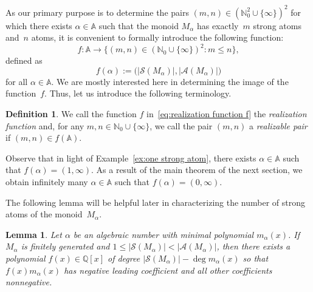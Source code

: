 \documentclass[11pt]{amsart}
\newtheorem{lemma}[theorem]{Lemma}
\theoremstyle{definition}
\newtheorem{definition}[theorem]{Definition}
\theoremstyle{remark}
\numberwithin{equation}{section}
\newcommand{\aaa}{\mathbb{A}}
\newcommand{\nn}{\mathbb{N}}
\newcommand{\qq}{\mathbb{Q}}
\newcommand{\nni}{\nn_0 \cup \{\infty\}}
\begin{document}
As our primary purpose is to determine the pairs $(m,n) \in (\nn_0^2 \cup \{\infty\})^2$ for which there exists $\alpha \in \aaa$ such that the monoid $M_\alpha$ has exactly~$m$ strong atoms and~$n$ atoms, it is convenient to formally introduce the following function:
\begin{equation} \label{eq:realization function f}
    f \colon \aaa \to \big\{ (m,n) \in (\nni)^2 : m \le n \big\},
\end{equation}
defined as
\[
    f(\alpha) := \big( |\mathcal{S}(M_\alpha)|, |\mathcal{A}(M_\alpha)|\big)
\]
for all $\alpha \in \aaa$. We are mostly interested here in determining the image of the function~$f$. Thus, let us introduce the following terminology.

\begin{definition}
	We call the function $f$ in~\eqref{eq:realization function f} the \emph{realization function} and, for any $m,n \in \nn_0 \cup \{\infty\}$, we call the pair $(m,n)$ a \emph{realizable pair} if $(m,n) \in f(\aaa)$.
\end{definition}


Observe that in light of Example~\ref{ex:one strong atom}, there exists $\alpha \in \aaa$ such that $f(\alpha) = (1,\infty)$. As a result of the main theorem of the next section, we obtain infinitely many $\alpha \in \aaa$ such that $f(\alpha) = (0,\infty)$.


The following lemma will be helpful later in characterizing the number of strong atoms of the monoid~$M_\alpha$.

\begin{lemma} \label{lem:strong atom as sum of lower degree terms}
    Let $\alpha$ be an algebraic number with minimal polynomial $m_\alpha(x)$. If~$M_\alpha$ is finitely generated and $1 \le |\mathcal{S}(M_\alpha)| < |\mathcal{A}(M_\alpha)|$, then there exists a polynomial $f(x) \in \qq[x]$ of degree $|\mathcal{S}(M_\alpha)| - \deg m_\alpha(x)$ so that $f(x)m_\alpha(x)$ has negative leading coefficient and all other coefficients nonnegative.
\end{lemma}
\end{document}
